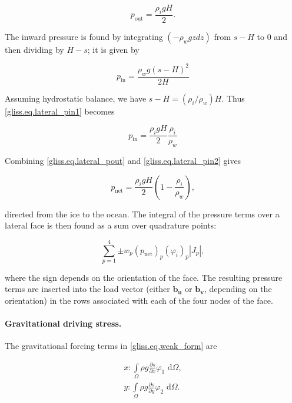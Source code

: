 {\begin{equation}
  \label{gliss.eq.lateral_pout}
  p_{\text{out}} = \frac{\rho_i g H}{2}.
\end{equation}

\noindent
The inward pressure is found by integrating $(-\rho_w g z dz)$ from $s-H$ to 0
and then dividing by $H-s$; it is given by

\begin{equation}
  \label{gliss.eq.lateral_pin1}
  p_{\text{in}} = \frac{\rho_w g (s-H)^2}{2H}
\end{equation}

\noindent
Assuming hydrostatic balance, we have $s-H = (\rho_i/\rho_w)H$. Thus \eqref{gliss.eq.lateral_pin1} becomes

\begin{equation}
  \label{gliss.eq.lateral_pin2}
  p_{\text{in}} = \frac{\rho_i g H}{2} \frac{\rho_i}{\rho_w}
\end{equation}

\noindent
Combining \eqref{gliss.eq.lateral_pout} and \eqref{gliss.eq.lateral_pin2} gives

\begin{equation}
  \label{gliss.eq.lateral_pnet}
  p_{\text{net}} = \frac{\rho_i g H}{2} \left(1 - \frac{\rho_i}{\rho_w}\right),
\end{equation}

\noindent
directed from the ice to the ocean.  
The integral of the pressure terms over a lateral face is then found as a sum over quadrature points:

\begin{equation}
  \label{gliss.eq.sum_over_qp_lateral}
  \sum\limits_{p=1}^{4} {\pm w_p (p_\text{net})_p (\varphi_i)_p |J_p|},
\end{equation}

\noindent
where the sign depends on the orientation of the face.  The resulting pressure terms
are inserted into the load vector (either $\mathbf{b_u}$ or $\mathbf{b_v}$, depending on the orientation)
in the rows associated with each of the four nodes of the face.

\paragraph{Gravitational driving stress.}

The gravitational forcing terms in \eqref{gliss.eq.weak_form} are

\begin{equation}
  \label{gliss.eq.gravity_forcing}
  \begin{split}
    x: \int\limits_{\Omega } {\rho g\frac{\partial s}{\partial x}} {{\varphi }_{1}}\text{ d}\Omega, \\
    y: \int\limits_{\Omega } {\rho g\frac{\partial s}{\partial y}} {{\varphi }_{2}}\text{ d}\Omega. \\
  \end{split}
\end{equation}

}
